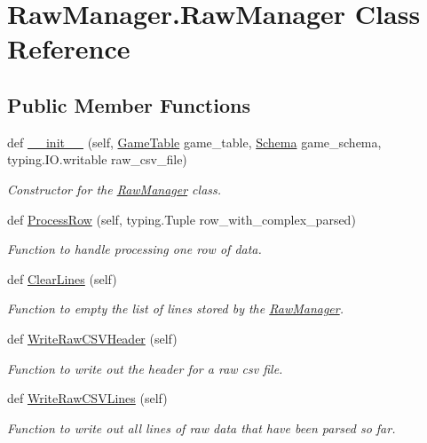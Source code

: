 \hypertarget{class_raw_manager_1_1_raw_manager}{}\section{Raw\+Manager.\+Raw\+Manager Class Reference}
\label{class_raw_manager_1_1_raw_manager}
\subsection*{Public Member Functions}
\begin{DoxyCompactItemize}
\item 
def \mbox{\hyperlink{class_raw_manager_1_1_raw_manager_a44e637891a42f1bf6aab68a21a10aefe}{\+\_\+\+\_\+init\+\_\+\+\_\+}} (self, \mbox{\hyperlink{class_game_table}{Game\+Table}} game\+\_\+table, \mbox{\hyperlink{classschemas_1_1_schema_1_1_schema}{Schema}} game\+\_\+schema, typing.\+I\+O.\+writable raw\+\_\+csv\+\_\+file)
\begin{DoxyCompactList}\small\item\em Constructor for the \mbox{\hyperlink{class_raw_manager_1_1_raw_manager}{Raw\+Manager}} class. \end{DoxyCompactList}\item 
def \mbox{\hyperlink{class_raw_manager_1_1_raw_manager_ac3f8a97ca8ffb14d53201adbd2e59b93}{Process\+Row}} (self, typing.\+Tuple row\+\_\+with\+\_\+complex\+\_\+parsed)
\begin{DoxyCompactList}\small\item\em Function to handle processing one row of data. \end{DoxyCompactList}\item 
def \mbox{\hyperlink{class_raw_manager_1_1_raw_manager_ab8a53bb1ce2f9004fba4648f3a0a6e11}{Clear\+Lines}} (self)
\begin{DoxyCompactList}\small\item\em Function to empty the list of lines stored by the \mbox{\hyperlink{class_raw_manager_1_1_raw_manager}{Raw\+Manager}}. \end{DoxyCompactList}\item 
def \mbox{\hyperlink{class_raw_manager_1_1_raw_manager_af32f66ba9cb28dfebb2cf25ebfb84eee}{Write\+Raw\+C\+S\+V\+Header}} (self)
\begin{DoxyCompactList}\small\item\em Function to write out the header for a raw csv file. \end{DoxyCompactList}\item 
def \mbox{\hyperlink{class_raw_manager_1_1_raw_manager_ae4f7b4b222a87497737128143043159c}{Write\+Raw\+C\+S\+V\+Lines}} (self)
\begin{DoxyCompactList}\small\item\em Function to write out all lines of raw data that have been parsed so far. \end{DoxyCompactList}\end{DoxyCompactItemize}
